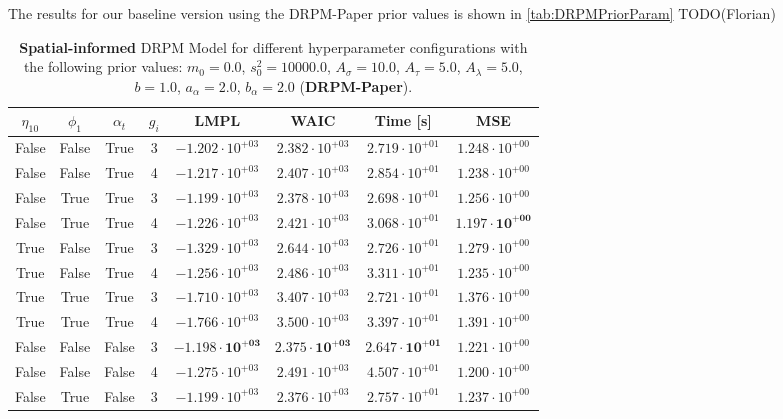 \documentclass[12pt,a4paper]{article}
\begin{document}
The results for our baseline version using the DRPM-Paper prior values is shown in \cref{tab:DRPMPriorParam}
TODO(Florian)
% 

\begin{table}
\caption{\textbf{Spatial-informed} DRPM Model for different hyperparameter configurations with the following prior values: $m_0 = 0.0$, $s_0^2 = 10000.0$, $A_\sigma = 10.0$, $A_\tau = 5.0$, $A_\lambda = 5.0$, $b = 1.0$, $a_\alpha = 2.0$, $b_\alpha = 2.0$ (\textbf{DRPM-Paper}).}
\centering\begin{tabular}{cccccccc}
\toprule
$\eta_{10}$ & $\phi_1$ & $\alpha_t$ & $g_i$ & LMPL & WAIC & Time [s] & MSE \\
\midrule
False & False & True & 3 & $-1.202 \cdot 10^{+03}$ & $2.382 \cdot 10^{+03}$ & $2.719 \cdot 10^{+01}$ & $1.248 \cdot 10^{+00}$ \\
False & False & True & 4 & $-1.217 \cdot 10^{+03}$ & $2.407 \cdot 10^{+03}$ & $2.854 \cdot 10^{+01}$ & $1.238 \cdot 10^{+00}$  \\
False & True & True & 3 & $-1.199 \cdot 10^{+03}$ & $2.378 \cdot 10^{+03}$ & $2.698 \cdot 10^{+01}$ & $1.256 \cdot 10^{+00}$  \\
False & True & True & 4 & $-1.226 \cdot 10^{+03}$ & $2.421 \cdot 10^{+03}$ & $3.068 \cdot 10^{+01}$ & $\mathbf{1.197 \cdot 10^{+00}}$  \\
True & False & True & 3 & $-1.329 \cdot 10^{+03}$ & $2.644 \cdot 10^{+03}$ & $2.726 \cdot 10^{+01}$ & $1.279 \cdot 10^{+00}$  \\
True & False & True & 4 & $-1.256 \cdot 10^{+03}$ & $2.486 \cdot 10^{+03}$ & $3.311 \cdot 10^{+01}$ & $1.235 \cdot 10^{+00}$  \\
True & True & True & 3 & $-1.710 \cdot 10^{+03}$ & $3.407 \cdot 10^{+03}$ & $2.721 \cdot 10^{+01}$ & $1.376 \cdot 10^{+00}$ \\
True & True & True & 4 & $-1.766 \cdot 10^{+03}$ & $3.500 \cdot 10^{+03}$ & $3.397 \cdot 10^{+01}$ & $1.391 \cdot 10^{+00}$ \\
False & False & False & 3 & $\mathbf{-1.198 \cdot 10^{+03}}$ & $\mathbf{2.375 \cdot 10^{+03}}$ & $\mathbf{2.647 \cdot 10^{+01}}$ & $1.221 \cdot 10^{+00}$  \\
False & False & False & 4 & $-1.275 \cdot 10^{+03}$ & $2.491 \cdot 10^{+03}$ & $4.507 \cdot 10^{+01}$ & $1.200 \cdot 10^{+00}$  \\
False & True & False & 3 & $-1.199 \cdot 10^{+03}$ & $2.376 \cdot 10^{+03}$ & $2.757 \cdot 10^{+01}$ & $1.237 \cdot 10^{+00}$ \\

\end{tabular}
\end{table}
\end{document}
